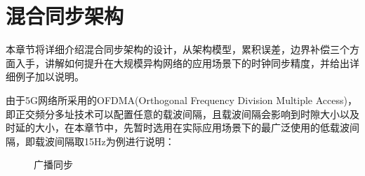\documentclass[UTF8,a4paper,12pt]{ctexart}
\numberwithin{equation}{section}
\begin{document}
\newpage
{}
\section{混合同步架构}
本章节将详细介绍混合同步架构的设计，从架构模型，累积误差，边界补偿三个方面入手，讲解如何提升在大规模异构网络的应用场景下的时钟同步精度，并给出详细例子加以说明。

由于5G网络所采用的OFDMA(Orthogonal Frequency Division Multiple Access)，即正交频分多址技术可以配置任意的载波间隔，且载波间隔会影响到时隙大小以及时延的大小，在本章节中，先暂时选用在实际应用场景下的最广泛使用的低载波间隔，即载波间隔取15Hz为例进行说明：
\begin{figure}[htb]
	\caption{\label{1} 广播同步}
\end{figure}
\end{document}
